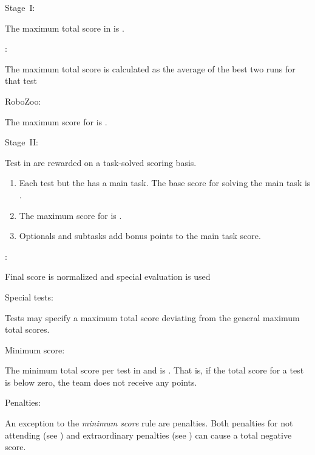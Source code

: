 \begin{enumerate}
	{\bf\item Stage~I:} The maximum total score in  is .
	\begin{enumerate}
		{\bf\item {}:} The maximum total score is calculated as the average of the best two runs for that test
		{\bf\item RoboZoo:} The maximum score for  is .
	\end{enumerate}

	{\bf\item Stage~II:} Test in  are rewarded on a task-solved scoring basis.
	\begin{enumerate}
		\item Each test but the  has a main task. The base score for solving the main task is \scoring{25 points}.
		\item The maximum score for  is \scoring{20 points}.
		\item Optionals and subtasks add bonus points to the main task score.
	\end{enumerate}

	{\bf\item {}:} Final score is normalized and special evaluation is used

	{\bf\item Special tests:} Tests may specify a maximum total score deviating from the general maximum total scores.

	{\bf\item Minimum score:} The minimum total score per test in  and  is . That is, if the total score for a test is below zero, the team does not receive any points.

	{\bf\item Penalties:} An exception to the \emph{minimum score} rule are penalties. Both penalties for not attending (see ) and extraordinary penalties (see ) can cause a total negative score. 


\end{enumerate}
